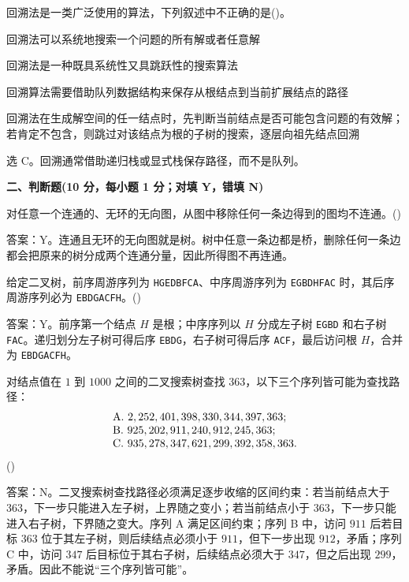 \begin{question}
回溯法是一类广泛使用的算法，下列叙述中不正确的是(\quad)。
\begin{choiceoptions}[2]
  \item 回溯法可以系统地搜索一个问题的所有解或者任意解
  \item 回溯法是一种既具系统性又具跳跃性的搜索算法
  \item 回溯算法需要借助队列数据结构来保存从根结点到当前扩展结点的路径
  \item 回溯法在生成解空间的任一结点时，先判断当前结点是否可能包含问题的有效解；若肯定不包含，则跳过对该结点为根的子树的搜索，逐层向祖先结点回溯
\end{choiceoptions}
\begin{solution}
选 C。回溯通常借助递归栈或显式栈保存路径，而不是队列。
\end{solution}
\end{question}


\textbf{二、判断题(10 分，每小题 1 分；对填 Y，错填 N)}

\begin{question}
对任意一个连通的、无环的无向图，从图中移除任何一条边得到的图均不连通。(\quad)
\begin{solution}
答案：Y。连通且无环的无向图就是树。树中任意一条边都是桥，删除任何一条边都会把原来的树分成两个连通分量，因此所得图不再连通。
\end{solution}
\end{question}

\begin{question}
给定二叉树，前序周游序列为 \texttt{HGEDBFCA}、中序周游序列为 \texttt{EGBDHFAC} 时，其后序周游序列必为 \texttt{EBDGACFH}。(\quad)
\begin{solution}
答案：Y。前序第一个结点 $H$ 是根；中序序列以 $H$ 分成左子树 \texttt{EGBD} 和右子树 \texttt{FAC}。递归划分左子树可得后序 \texttt{EBDG}，右子树可得后序 \texttt{ACF}，最后访问根 $H$，合并为 \texttt{EBDGACFH}。
\end{solution}
\end{question}

\begin{question}
对结点值在 $1$ 到 $1000$ 之间的二叉搜索树查找 $363$，以下三个序列皆可能为查找路径：
\[
\begin{array}{@{}l@{}}
\text{A}.\ 2,252,401,398,330,344,397,363;\\
\text{B}.\ 925,202,911,240,912,245,363;\\
\text{C}.\ 935,278,347,621,299,392,358,363.
\end{array}
\]
(\quad)
\begin{solution}
答案：N。二叉搜索树查找路径必须满足逐步收缩的区间约束：若当前结点大于 $363$，下一步只能进入左子树，上界随之变小；若当前结点小于 $363$，下一步只能进入右子树，下界随之变大。序列 A 满足区间约束；序列 B 中，访问 $911$ 后若目标 $363$ 位于其左子树，则后续结点必须小于 $911$，但下一步出现 $912$，矛盾；序列 C 中，访问 $347$ 后目标位于其右子树，后续结点必须大于 $347$，但之后出现 $299$，矛盾。因此不能说“三个序列皆可能”。
\end{solution}
\end{question}


